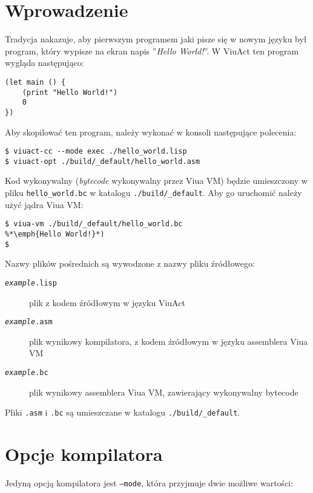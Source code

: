 \section{Wprowadzenie}

Tradycja nakazuje, aby pierwszym programem jaki pisze się w nowym języku był program, który wypisze na ekran
napis ''\emph{Hello World!}''. W ViuAct ten program wygląda następująco:

\begin{lstlisting}
(let main () {
    (print "Hello World!")
    0
})
\end{lstlisting}

Aby skopilować ten program, należy wykonać w konsoli następujące polecenia:

\begin{lstlisting}
$ viuact-cc --mode exec ./hello_world.lisp
$ viuact-opt ./build/_default/hello_world.asm
\end{lstlisting}

Kod wykonywalny (\emph{bytecode} wykonywalny przez Viua VM) będzie umieszczony w pliku
\texttt{hello\_world.bc} w katalogu \texttt{./build/\_default}.
Aby go uruchomić należy użyć jądra Viua VM:

\begin{lstlisting}
$ viua-vm ./build/_default/hello_world.bc
%*\emph{Hello World!}*)
$
\end{lstlisting}

Nazwy plików pośrednich są wywodzone z nazwy pliku źródłowego:

\begin{description}
    \item[\texttt{\emph{example}.lisp}] plik z kodem źródłowym w języku ViuAct
    \item[\texttt{\emph{example}.asm}] plik wynikowy kompilatora, z kodem źródłowym w języku assemblera Viua
        VM
    \item[\texttt{\emph{example}.bc}] plik wynikowy assemblera Viua VM, zawierający wykonywalny bytecode
\end{description}

Pliki \texttt{.asm} i \texttt{.bc} są umieszczane w katalogu \texttt{./build/\_default}.

\newpage
\section{Opcje kompilatora}

Jedyną opcją kompilatora jest \texttt{--mode}, która przyjmuje dwie możliwe wartości:

